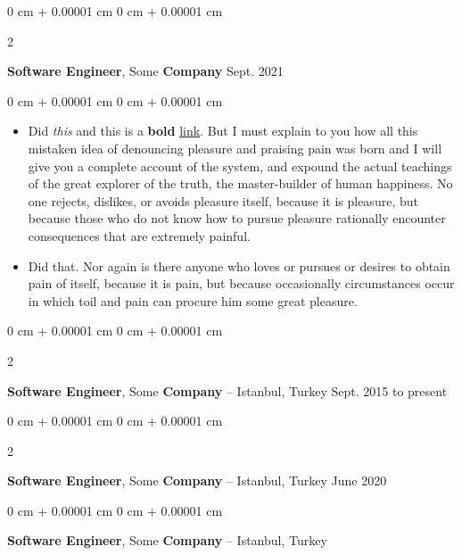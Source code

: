 \documentclass[10pt, letterpaper]{article}
\newenvironment{highlights}{
    \begin{itemize}[
        topsep=0.10 cm,
        parsep=0.10 cm,
        partopsep=0pt,
        itemsep=0pt,
        leftmargin=0 cm + 10pt
    ]
}{
    \end{itemize}
} %
\newenvironment{onecolentry}{
    \begin{adjustwidth}{
        0 cm + 0.00001 cm
    }{
        0 cm + 0.00001 cm
    }
}{
    \end{adjustwidth}
} %
\newenvironment{twocolentry}[2][]{
    \onecolentry
    \def\secondColumn{#2}
    \setcolumnwidth{\fill, 4.5 cm}
    \begin{paracol}{2}
}{
    \switchcolumn \raggedleft \secondColumn
    \end{paracol}
    \endonecolentry
} %
\begin{document}
        \begin{twocolentry}{
            Sept. 2021
        }
            \textbf{Software Engineer}, Some \textbf{Company}\end{twocolentry}

        \vspace{0.10 cm}
        \begin{onecolentry}
            \begin{highlights}
                \item Did \textit{this} and this is a \textbf{bold} \href{https://example.com}{link}. But I must explain to you how all this mistaken idea of denouncing pleasure and praising pain was born and I will give you a complete account of the system, and expound the actual teachings of the great explorer of the truth, the master-builder of human happiness. No one rejects, dislikes, or avoids pleasure itself, because it is pleasure, but because those who do not know how to pursue pleasure rationally encounter consequences that are extremely painful.
                \item Did that. Nor again is there anyone who loves or pursues or desires to obtain pain of itself, because it is pain, but because occasionally circumstances occur in which toil and pain can procure him some great pleasure.
            \end{highlights}
        \end{onecolentry}


        \vspace{0.2 cm}

        \begin{twocolentry}{
            Sept. 2015 to present
        }
            \textbf{Software Engineer}, Some \textbf{Company} -- Istanbul, Turkey\end{twocolentry}



        \vspace{0.2 cm}

        \begin{twocolentry}{
            June 2020
        }
            \textbf{Software Engineer}, Some \textbf{Company} -- Istanbul, Turkey\end{twocolentry}



        \vspace{0.2 cm}

        \begin{onecolentry}
            \textbf{Software Engineer}, Some \textbf{Company} -- Istanbul, Turkey\end{onecolentry}
\end{document}
